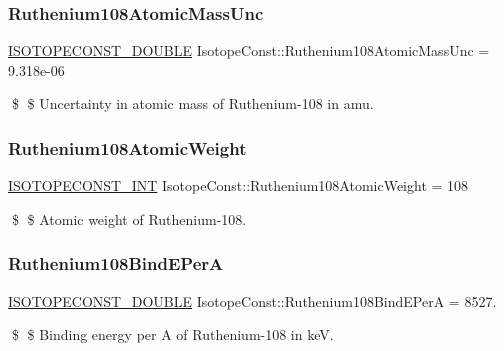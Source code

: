 \subsubsection{\texorpdfstring{Ruthenium108\+Atomic\+Mass\+Unc}{Ruthenium108AtomicMassUnc}}
{\footnotesize\ttfamily \mbox{\hyperlink{group___isotope_const-_macros_ga8f45a7272ce02c0b4c65c44636ed719a}{I\+S\+O\+T\+O\+P\+E\+C\+O\+N\+S\+T\+\_\+\+D\+O\+U\+B\+LE}} Isotope\+Const\+::\+Ruthenium108\+Atomic\+Mass\+Unc = 9.\+318e-\/06}

\$ \$ Uncertainty in atomic mass of Ruthenium-\/108 in amu. \mbox{\label{group___isotope_const-_ruthenium-_ru108_ga3385c1978604a6a1f7e371dfa68c3d0f}} 
\subsubsection{\texorpdfstring{Ruthenium108\+Atomic\+Weight}{Ruthenium108AtomicWeight}}
{\footnotesize\ttfamily \mbox{\hyperlink{group___isotope_const-_macros_ga5f18360b3e99483a35c32d789e62621c}{I\+S\+O\+T\+O\+P\+E\+C\+O\+N\+S\+T\+\_\+\+I\+NT}} Isotope\+Const\+::\+Ruthenium108\+Atomic\+Weight = 108}

\$ \$ Atomic weight of Ruthenium-\/108. \mbox{\label{group___isotope_const-_ruthenium-_ru108_gaa4e5508070941de0e83e70352397455b}} 
\subsubsection{\texorpdfstring{Ruthenium108\+Bind\+E\+PerA}{Ruthenium108BindEPerA}}
{\footnotesize\ttfamily \mbox{\hyperlink{group___isotope_const-_macros_ga8f45a7272ce02c0b4c65c44636ed719a}{I\+S\+O\+T\+O\+P\+E\+C\+O\+N\+S\+T\+\_\+\+D\+O\+U\+B\+LE}} Isotope\+Const\+::\+Ruthenium108\+Bind\+E\+PerA = 8527.}

\$ \$ Binding energy per A of Ruthenium-\/108 in keV. \mbox{\label{group___isotope_const-_ruthenium-_ru108_ga9728dd8f751e102a0f5fd86ac26d4a1e}} 
